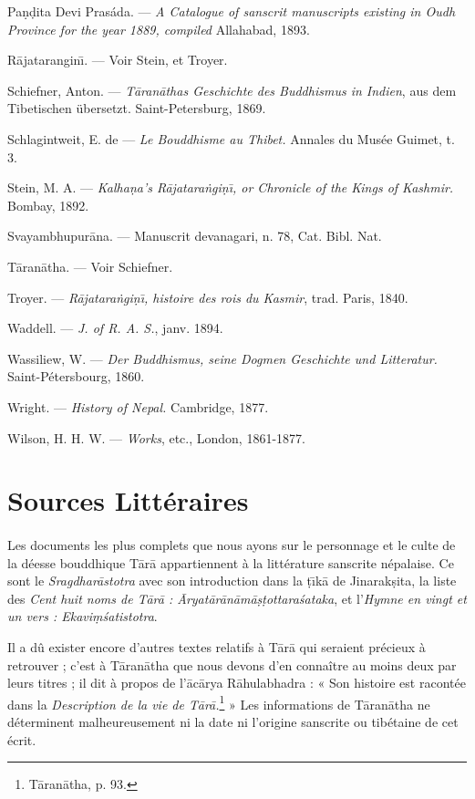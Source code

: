\documentclass[a4paper, 11pt, oneside, french, landscape, twocolumn]{article}
\begin{document}
Pa\d{n}\d{d}ita Devi Prasáda. --- \emph{A Catalogue of sanscrit manuscripts existing in Oudh Province for the year 1889, compiled} Allahabad, 1893.

R\={a}jatarangin\={\i}. --- Voir Stein, et Troyer.

Schiefner, Anton. --- \emph{T\={a}ran\={a}thas Geschichte des Buddhismus in Indien}, aus dem Tibetischen übersetzt. Saint-Petersburg, 1869.

Schlagintweit, E. de --- \emph{Le Bouddhisme au Thibet.} Annales du Musée Guimet, t. 3.

Stein, M. A. --- \emph{Kalha\d{n}a's R\={a}jatara\.{n}gi\d{n}\={\i}, or Chronicle of the Kings of Kashmir.} Bombay, 1892.

Svayambhupur\={a}na. --- Manuscrit devanagari, n. 78, Cat. Bibl. Nat.

T\={a}ran\={a}tha. --- Voir Schiefner.

Troyer. --- \emph{R\={a}jatara\.{n}gi\d{n}\={\i}, histoire des rois du Kasmir}, trad. Paris, 1840.

Waddell. --- \emph{J. of R. A. S.}, janv. 1894.

Wassiliew, W. --- \emph{Der Buddhismus, seine Dogmen Geschichte und Litteratur.} Saint-Pétersbourg, 1860.

Wright. --- \emph{History of Nepal.} Cambridge, 1877.

Wilson, H. H. W. --- \emph{Works}, etc., London, 1861-1877.
\clearpage
\normalsize
\section{Sources Littéraires}
\paragraph{}
Les documents les plus complets que nous ayons sur le personnage et le culte de la déesse bouddhique T\={a}r\={a} appartiennent à la littérature sanscrite népalaise. Ce sont le \emph{Sragdhar\={a}stotra} avec son introduction dans la \d{t}\={\i}k\={a} de Jinarak\d{s}ita, la liste des \emph{Cent huit noms de T\={a}r\={a} : \={A}ryat\={a}r\={a}n\={a}m\={a}\d{s}\d{t}ottara\'{s}ataka}, et l'\emph{Hymne en vingt et un vers : Ekavi\d{m}\'{s}atistotra}.

Il a dû exister encore d'autres textes relatifs à T\={a}r\={a} qui seraient précieux à retrouver ; c'est à T\={a}ran\={a}tha que nous devons d'en connaître au moins deux par leurs titres ; il dit à propos de l'\={a}c\={a}rya R\={a}hulabhadra : « Son histoire est racontée dans la \emph{Description de la vie de T\={a}r\={a}.}\footnote{T\={a}ran\={a}tha, p. 93.} » Les informations de T\={a}ran\={a}tha ne déterminent malheureusement ni la date ni l'origine sanscrite ou tibétaine de cet écrit.
\end{document}
